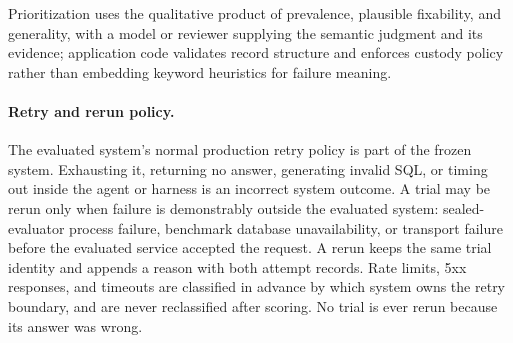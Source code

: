 Prioritization uses the qualitative product of prevalence, plausible fixability,
and generality, with a model or reviewer supplying the semantic judgment and its
evidence; application code validates record structure and enforces custody policy
rather than embedding keyword heuristics for failure meaning.

\paragraph{Retry and rerun policy.}
The evaluated system's normal production retry policy is part of the frozen
system. Exhausting it, returning no answer, generating invalid SQL, or timing out
inside the agent or harness is an incorrect system outcome. A trial may be rerun
only when failure is demonstrably outside the evaluated system: sealed-evaluator
process failure, benchmark database unavailability, or transport failure before
the evaluated service accepted the request. A rerun keeps the same trial
identity and appends a reason with both attempt records. Rate limits, 5xx
responses, and timeouts are classified in advance by which system owns the retry
boundary, and are never reclassified after scoring. No trial is ever rerun
because its answer was wrong.
